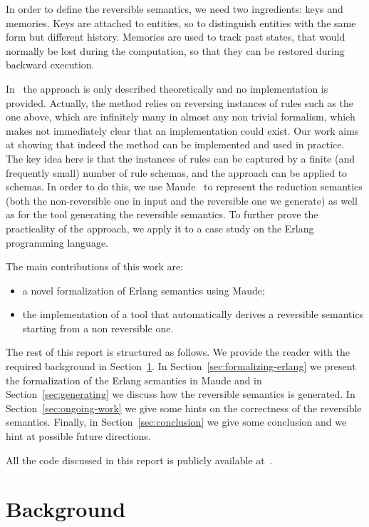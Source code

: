 \documentclass{article}[12pt,a4paper]
\theoremstyle{definition}
\begin{document}
In order to define the reversible semantics, we need two ingredients: keys and memories.
Keys are attached to entities, so to distinguish entities with the same form but different history.
Memories are used to track past states, that would normally be lost during the computation, so that
they can be restored during backward execution.

In~\cite{LaneseM20} the approach is only described theoretically and
no implementation is provided. Actually, the method relies on
reversing instances of rules such as the one above, which are infinitely many in almost any
non trivial formalism, which makes not immediately clear that an
implementation could exist. Our work aims at showing that indeed the
method can be implemented and used in practice.  The key idea here is
that the instances of rules can be captured by a finite (and
frequently small) number of rule schemas, and the approach can be
applied to schemas. In order to do this, we use Maude~\cite{maude} to represent the reduction semantics (both the non-reversible one in input and the reversible one we generate) as well as for the tool generating the reversible semantics.
To further prove the practicality of the
approach, we apply it to a case study on the Erlang programming
language.

The main contributions of this work are:
\begin{itemize}
  \item a novel formalization of Erlang semantics using
    Maude;
  \item the implementation of a tool that automatically derives a reversible
    semantics starting from a non reversible one.
\end{itemize}

The rest of this report is structured as follows. We provide the reader with the required
background in Section~\ref{sec:background}. In
Section~\ref{sec:formalizing-erlang} we present the formalization of
the Erlang semantics in Maude and in Section~\ref{sec:generating} we discuss how the reversible semantics
is generated. In Section~\ref{sec:ongoing-work} we give some hints on the correctness of the reversible semantics. Finally, in Section~\ref{sec:conclusion} we give some
conclusion and we hint at possible future directions.

All the code discussed in this report is publicly available
at~\cite{erl-maude-repo}. 

\section{Background}\label{sec:background}
\end{document}
